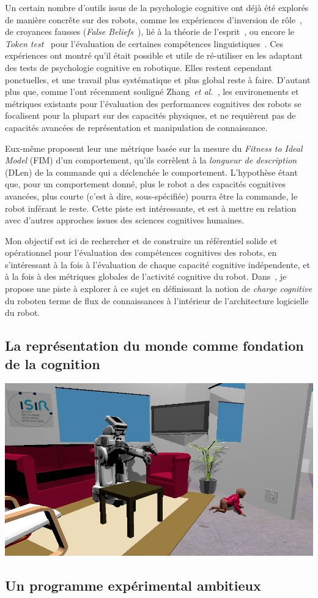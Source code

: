 \documentclass[a4paper]{article}
\newcommand{\etal}{{\textit{et al.~}}}
\begin{document}
Un certain nombre d'outils issus de la psychologie cognitive ont déjà été
explorés de manière concrête sur des robots, comme les expériences d'inversion
de rôle~\cite{Lallee2010b}, de croyances fausses (\emph{False
Beliefs}~\cite{Leslie2000}), lié à la théorie de l'esprit~\cite{Breazeal2006,
Warnier2012a}, ou encore le \emph{Token test}~\cite{DiSimoni1978} pour
l'évaluation de certaines compétences linguistiques~\cite{Mavridis2006}. Ces
expériences ont montré qu'il était possible et utile de ré-utiliser en les
adaptant des tests de psychologie cognitive en robotique. Elles restent
cependant ponctuelles, et une travail plus systématique et plus global reste à
faire. D'autant plus que, comme l'ont récemment souligné
Zhang~\etal\cite{zhang2013evaluation}, les environements et métriques existants
pour l'évaluation des performances cognitives des robots se focalisent pour la
plupart sur des capacités physiques, et ne requièrent pas de capacités avancées
de représentation et manipulation de connaissance.

Eux-même proposent leur une métrique basée sur la mesure du \emph{Fitness to Ideal Model} (FIM) d'un
comportement, qu'ils corrèlent à la \emph{longueur de description} (DLen) de la
commande qui a déclenchée le comportement. L'hypothèse étant que, pour un
comportement donné, plus le robot a des capacités cognitives avancées, plus
courte (c'est à dire, sous-spécifiée) pourra être la commande, le robot inférant
le reste. Cette piste est intéressante, et est à mettre en relation avec
d'autres approches issues des sciences cognitives humaines.

Mon objectif est ici de rechercher et de construire un référentiel solide et
opérationnel pour l'évaluation des compétences cognitives des robots, en
s'intéressant à la fois à l'évaluation de chaque capacité cognitive
indépendente, et à la fois à des métriques globales de l'activité cognitive du
robot. Dans~\cite{lemaignan2013explicit}, je propose une piste à explorer à ce
sujet en définissant la notion de \emph{charge cognitive} du roboten terme de
flux de connaissances à l'intérieur de l'architecture logicielle du robot.

\subsection{La représentation du monde comme fondation de la cognition}

\includegraphics[width=\textwidth]{figs/robots_home_baby_socket.jpg}

\subsection{Un programme expérimental ambitieux}




\printbibliography
\end{document}
